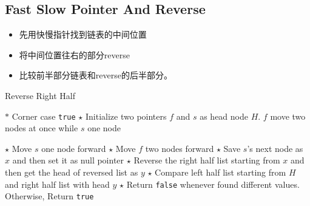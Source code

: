 \subsection{Fast Slow Pointer And Reverse}
\begin{CJK*}{UTF8}{gbsn}
\begin{itemize}
\item 先用快慢指针找到链表的中间位置
\item 将中间位置往右的部分reverse
\item 比较前半部分链表和reverse的后半部分。
\end{itemize}
\end{CJK*}
\setcounter{algorithm}{0}
\begin{algorithm}[H]
\caption{Reverse Right Half}
\begin{algorithmic}[1]
\State $\ast$ Corner case
\State \Return \texttt{true}
\EndIf
\State $\star$ Initialize two pointers $f$ and $s$ as head node $H$. $f$ move two nodes at once while $s$ one node
\end{algorithmic}
\end{algorithm}
\begin{algorithm}[H]
\begin{algorithmic}[1]
\State $\star$ Move $s$ one node forward
\State $\star$ Move $f$ two nodes forward
\EndWhile
\State $\star$ Save $s$'s next node as $x$ and then set it as null pointer
\State $\star$ Reverse the right half list starting from $x$ and then get the head of reversed list as $y$
\State $\star$ Compare left half list starting from $H$ and right half list with head $y$
\State $\star$ Return \texttt{false} whenever found different values. Otherwise, Return \texttt{true}
\EndProcedure
\end{algorithmic}
\end{algorithm}
\setcounter{lstlisting}{0}
